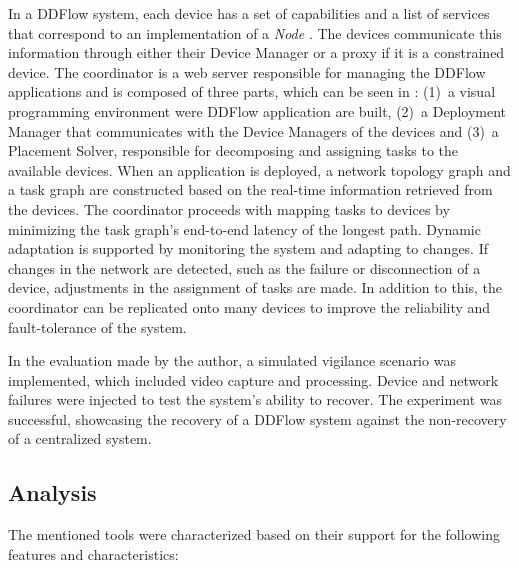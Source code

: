 In a DDFlow system, each device has a set of capabilities and a list of services that correspond to an implementation of a \textit{Node} . The devices communicate this information through either their Device Manager or a proxy if it is a constrained device. The coordinator is a web server responsible for managing the DDFlow applications and is composed of three parts, which can be seen in : (1)~a visual programming environment were DDFlow application are built, (2)~a Deployment Manager that communicates with the Device Managers of the devices and (3)~a Placement Solver, responsible for decomposing and assigning tasks to the available devices. When an application is deployed, a network topology graph and a task graph are constructed based on the real-time information retrieved from the devices. The coordinator proceeds with mapping tasks to devices by minimizing the task graph's end-to-end latency of the longest path. Dynamic adaptation is supported by monitoring the system and adapting to changes. If changes in the network are detected, such as the failure or disconnection of a device, adjustments in the assignment of tasks are made. In addition to this, the coordinator can be replicated onto many devices to improve the reliability and fault-tolerance of the system.

In the evaluation made by the author, a simulated vigilance scenario was implemented, which included video capture and processing. Device and network failures were injected to test the system's ability to recover. The experiment was successful, showcasing the recovery of a DDFlow system against the non-recovery of a centralized system.

\subsection{Analysis}\label{sec:decentralized_sota_analysis}

The mentioned tools were characterized based on their support for the following features and characteristics:

